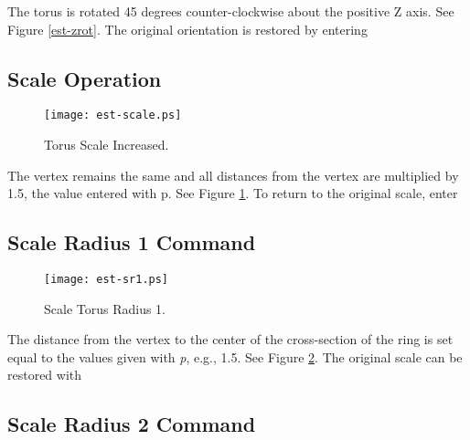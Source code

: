 The torus is rotated 45 degrees counter-clockwise about the positive Z axis.
See Figure \ref{est-zrot}.
The original orientation is restored by entering


\subsection{Scale Operation}

\begin{figure}
\centering \texttt{[image: est-scale.ps]}
\caption{Torus Scale Increased.}
\label{est-scale}
\end{figure}


The vertex remains the same and all distances from the vertex are
multiplied by 1.5, the value entered with p.  See Figure \ref{est-scale}.
To return to the original scale, enter


\subsection{Scale Radius 1 Command}

\begin{figure}
\centering \texttt{[image: est-sr1.ps]}
\caption{Scale Torus Radius 1.}
\label{est-sr1}
\end{figure}


The distance from the vertex to the center of the cross-section of the
ring is set equal to the values given with {\em p}, e.g., 1.5.
See Figure \ref{est-sr1}.
The original scale can be restored with


\subsection{Scale Radius 2 Command}

